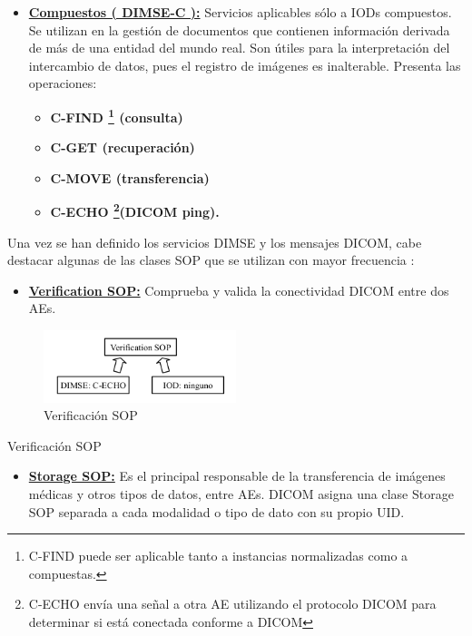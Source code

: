 \begin{itemize}
\item \textbf{\underline{Compuestos ( DIMSE-C ):}} Servicios aplicables sólo a IODs compuestos. Se utilizan en la gestión de documentos que contienen información derivada de más de una entidad del mundo real. Son útiles para la interpretación del intercambio de datos, pues el registro de imágenes es inalterable. Presenta las operaciones:
\begin{itemize}
	\item \textbf{C-FIND \footnote{C-FIND puede ser aplicable tanto a instancias normalizadas como a compuestas.} (consulta)}
	\item \textbf{C-GET (recuperación)}
	\item \textbf{C-MOVE (transferencia)}
	\item \textbf{C-ECHO \footnote{C-ECHO envía una señal a otra AE utilizando el protocolo DICOM para determinar si está conectada conforme a DICOM}(DICOM ping).}
\end{itemize}
\end{itemize}

Una vez se han definido los servicios \acs{DIMSE} y los mensajes \acs{DICOM}, cabe destacar algunas de las clases SOP que se utilizan con mayor frecuencia \cite{10}:
\begin{itemize}
\item \textbf{\underline{Verification SOP:}} Comprueba y valida la conectividad DICOM entre dos AEs.
\end{itemize}

\begin{figure}[!h]
\begin{center}
\includegraphics[width=0.5\textwidth]{images/verificacionSOP.png}
\caption{Verificación SOP}
\label{fig:verificationSOP}
\end{center}
\end{figure}

\begin{table}[hp]
\centering{
\small
}
\caption{Verificación SOP}
\label{tab:verificationSOP}
\end{table}

\begin{itemize}
\item \textbf{\underline{Storage SOP:}} Es el principal responsable de la transferencia de imágenes médicas y otros tipos de datos, entre AEs. DICOM asigna una clase Storage SOP separada a cada modalidad o tipo de dato con su propio UID.
\end{itemize}

